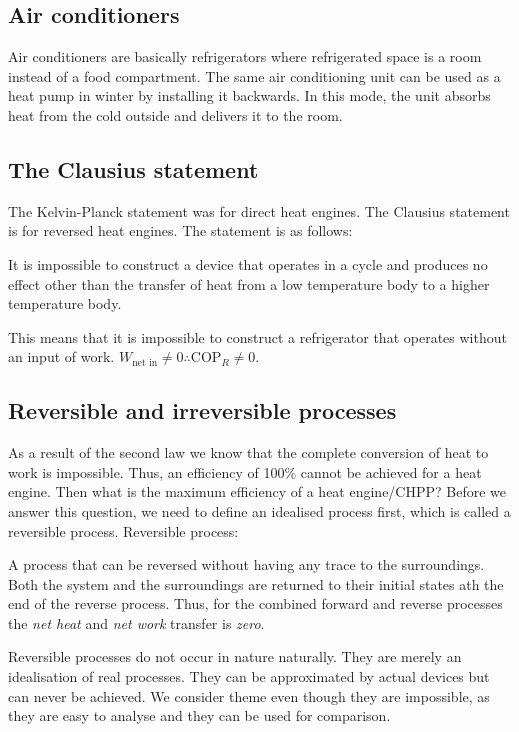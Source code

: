 \subsection{Air conditioners}
Air conditioners are basically refrigerators where refrigerated space is a room instead of a food compartment. The same air conditioning unit can be used as a heat pump in winter by installing it backwards. In this mode, the unit absorbs heat from the cold outside and delivers it to the room.
\subsection{The Clausius statement}
The Kelvin-Planck statement was for direct heat engines. The Clausius statement is for reversed heat engines. The statement is as follows:
\begin{center}
  It is impossible to construct a device that operates in a cycle and produces no effect other than the transfer of heat from a low temperature body to a higher temperature body.
\end{center}
This means that it is impossible to construct a refrigerator that operates without an input of work. \(W_{\textrm{net in}} \neq 0 \therefore \textrm{COP}_R \neq 0\).
\subsection{Reversible and irreversible processes}
As a result of the second law we know that the complete conversion of heat to work is impossible. Thus, an efficiency of 100\% cannot be achieved for a heat engine. Then what is the maximum efficiency of a heat engine/CHPP? Before we answer this question, we need to define an idealised process first, which is called a reversible process.
Reversible process:
\begin{center}
  A process that can be reversed without having any trace to the surroundings. Both the system and the surroundings are returned to their initial states ath the end of the reverse process. Thus, for the combined forward and reverse processes the \emph{net heat} and \emph{net work} transfer is \emph{zero}.
\end{center}
Reversible processes do not occur in nature naturally. They are merely an idealisation of real processes. They can be approximated by actual devices but can never be achieved. We consider theme even though they are impossible, as they are easy to analyse and they can be used for comparison.
